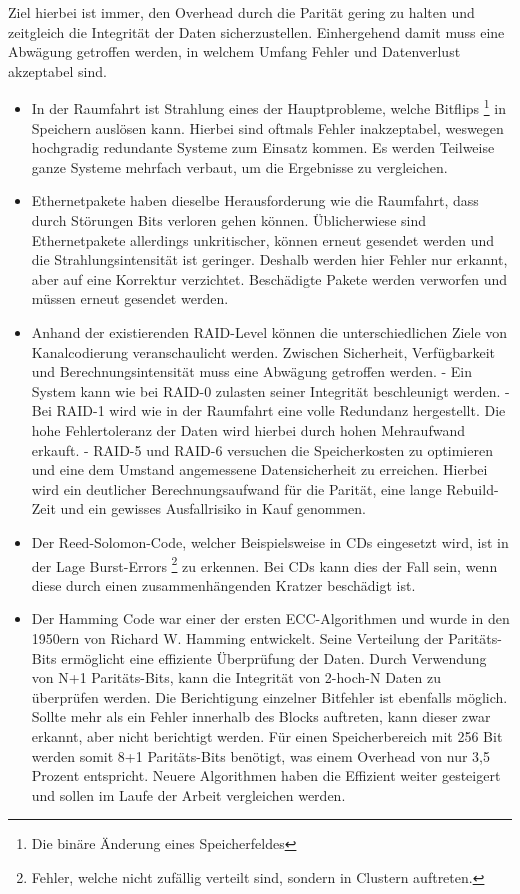 Ziel hierbei ist immer, den Overhead durch die Parität gering zu halten und zeitgleich die Integrität der Daten sicherzustellen.
Einhergehend damit muss eine Abwägung getroffen werden, in welchem Umfang Fehler und Datenverlust akzeptabel sind.

\begin{itemize}
	\item In der Raumfahrt ist Strahlung eines der Hauptprobleme, welche Bitflips
	\footnote{Die binäre Änderung eines Speicherfeldes}
	in Speichern auslösen kann.
	Hierbei sind oftmals Fehler inakzeptabel, weswegen hochgradig redundante Systeme zum Einsatz kommen.
	Es werden Teilweise ganze Systeme mehrfach verbaut, um die Ergebnisse zu vergleichen.
	\item Ethernetpakete haben dieselbe Herausforderung wie die Raumfahrt, dass durch Störungen Bits verloren gehen können.
	Üblicherwiese sind Ethernetpakete allerdings unkritischer, können erneut gesendet werden und die Strahlungsintensität ist geringer.
	Deshalb werden hier Fehler nur erkannt, aber auf eine Korrektur verzichtet.
	Beschädigte Pakete werden verworfen und müssen erneut gesendet werden.
	\cite{Spec} 
	\item Anhand der existierenden RAID-Level können die unterschiedlichen Ziele von Kanalcodierung veranschaulicht werden.
	Zwischen Sicherheit, Verfügbarkeit und Berechnungsintensität muss eine Abwägung getroffen werden.
	- Ein System kann wie bei RAID-0 zulasten seiner Integrität beschleunigt werden.
	- Bei RAID-1 wird wie in der Raumfahrt eine volle Redundanz hergestellt. Die hohe Fehlertoleranz der Daten wird hierbei durch hohen Mehraufwand erkauft.
	- RAID-5 und RAID-6 versuchen die Speicherkosten zu optimieren und eine dem Umstand angemessene Datensicherheit zu erreichen. Hierbei wird ein deutlicher Berechnungsaufwand für die Parität, eine lange Rebuild-Zeit und ein gewisses Ausfallrisiko in Kauf genommen.
	\item Der Reed-Solomon-Code, welcher Beispielsweise in CDs eingesetzt wird, ist in der Lage Burst-Errors
	\footnote{Fehler, welche nicht zufällig verteilt sind, sondern in Clustern auftreten.}
	zu erkennen.
	Bei CDs kann dies der Fall sein, wenn diese durch einen zusammenhängenden Kratzer beschädigt ist.
	\item Der Hamming Code war einer der ersten ECC-Algorithmen und wurde in den 1950ern von Richard W. Hamming entwickelt.
	Seine Verteilung der Paritäts-Bits ermöglicht eine effiziente Überprüfung der Daten.
	Durch Verwendung von N+1 Paritäts-Bits, kann die Integrität von 2-hoch-N Daten zu überprüfen  werden.
	Die Berichtigung einzelner Bitfehler ist ebenfalls möglich.
	Sollte mehr als ein Fehler innerhalb des Blocks auftreten, kann dieser zwar erkannt, aber nicht berichtigt werden.
	Für einen Speicherbereich mit 256 Bit werden somit 8+1 Paritäts-Bits benötigt, was einem Overhead von nur 3,5 Prozent entspricht.
	Neuere Algorithmen haben die Effizient weiter gesteigert und sollen im Laufe der Arbeit vergleichen werden.
\end{itemize}

